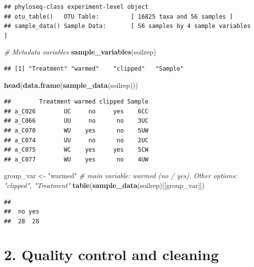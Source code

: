 \documentclass[
]{article}
\newenvironment{Shaded}{\begin{snugshade}}{\end{snugshade}}
\newcommand{\CommentTok}[1]{\textcolor[rgb]{0.56,0.35,0.01}{\textit{#1}}}
\newcommand{\FunctionTok}[1]{\textcolor[rgb]{0.13,0.29,0.53}{\textbf{#1}}}
\newcommand{\NormalTok}[1]{#1}
\newcommand{\OtherTok}[1]{\textcolor[rgb]{0.56,0.35,0.01}{#1}}
\newcommand{\StringTok}[1]{\textcolor[rgb]{0.31,0.60,0.02}{#1}}
\begin{document}
\begin{verbatim}
## phyloseq-class experiment-level object
## otu_table()   OTU Table:         [ 16825 taxa and 56 samples ]
## sample_data() Sample Data:       [ 56 samples by 4 sample variables ]
\end{verbatim}

\begin{Shaded}
\begin{Highlighting}[]
\CommentTok{\# Metadata variables}
\FunctionTok{sample\_variables}\NormalTok{(soilrep)}
\end{Highlighting}
\end{Shaded}

\begin{verbatim}
## [1] "Treatment" "warmed"    "clipped"   "Sample"
\end{verbatim}

\begin{Shaded}
\begin{Highlighting}[]
\FunctionTok{head}\NormalTok{(}\FunctionTok{data.frame}\NormalTok{(}\FunctionTok{sample\_data}\NormalTok{(soilrep)))}
\end{Highlighting}
\end{Shaded}

\begin{verbatim}
##        Treatment warmed clipped Sample
## a_C026        UC     no     yes    6CC
## a_C066        UU     no      no    3UC
## a_C070        WU    yes      no    5UW
## a_C074        UU     no      no    2UC
## a_C075        WC    yes     yes    5CW
## a_C077        WU    yes      no    4UW
\end{verbatim}

\begin{Shaded}
\begin{Highlighting}[]
\NormalTok{group\_var }\OtherTok{\textless{}{-}} \StringTok{"warmed"}          \CommentTok{\# main variable: warmed (no / yes). Other options: "clipped", "Treatment"}
\FunctionTok{table}\NormalTok{(}\FunctionTok{sample\_data}\NormalTok{(soilrep)[[group\_var]])}
\end{Highlighting}
\end{Shaded}

\begin{verbatim}
## 
##  no yes 
##  28  28
\end{verbatim}

\section{2. Quality control and
cleaning}\label{quality-control-and-cleaning}
\end{document}
